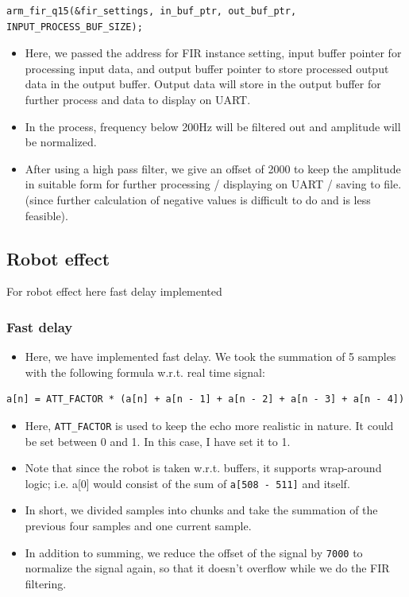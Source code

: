 \documentclass[11pt]{article}
\begin{document}
\begin{verbatim}
arm_fir_q15(&fir_settings, in_buf_ptr, out_buf_ptr, INPUT_PROCESS_BUF_SIZE);
\end{verbatim}

\begin{itemize}
\item Here, we passed the address for FIR instance setting, input buffer pointer for processing input data, and output buffer pointer to store processed output data in the output buffer. Output data will store in the output buffer for further process and data to display on UART.
\item In the process, frequency below 200Hz will be filtered out and amplitude will be normalized.
\item After using a high pass filter, we give an offset of 2000 to keep the amplitude in suitable form for further processing / displaying on UART / saving to file. (since further calculation of negative values is difficult to do and is less feasible).
\end{itemize}

\subsection{Robot effect}
\label{sec:orgd37237a}
For robot effect here fast delay implemented

\subsubsection*{Fast delay}
\label{sec:org41aca54}
\begin{itemize}
\item Here, we have implemented fast delay. We took the summation of 5 samples with the following formula w.r.t. real time signal:
\end{itemize}

\begin{verbatim}
a[n] = ATT_FACTOR * (a[n] + a[n - 1] + a[n - 2] + a[n - 3] + a[n - 4])
\end{verbatim}

\begin{itemize}
\item Here, \texttt{ATT\_FACTOR} is used to keep the echo more realistic in nature. It could be set between 0 and 1. In this case, I have set it to 1.
\item Note that since the robot is taken w.r.t. buffers, it supports wrap-around logic; i.e. a[0] would consist of the sum of \texttt{a[508 - 511]} and itself.
\item In short, we divided samples into chunks and take the summation of the previous four samples and one current sample.
\item In addition to summing, we reduce the offset of the signal by \texttt{7000} to normalize the signal again, so that it doesn't overflow while we do the FIR filtering.
\end{itemize}
\end{document}
